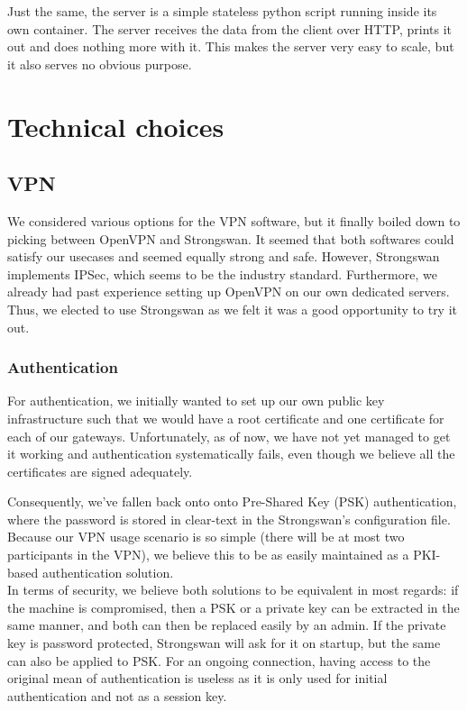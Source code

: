\documentclass[paper=a4, fontsize=11pt]{scrartcl}
\begin{document}
Just the same, the server is a simple stateless python script running inside its
own container.
The server receives the data from the client over HTTP, prints it out and does
nothing more with it.
This makes the server very easy to scale, but it also serves no obvious
purpose.

\section{Technical choices}

\subsection{VPN}

We considered various options for the VPN software, but it finally boiled down
to picking between OpenVPN and Strongswan.
It seemed that both softwares could satisfy our usecases and seemed equally
strong and safe.
However, Strongswan implements IPSec, which seems to be the industry standard.
Furthermore, we already had past experience setting up OpenVPN on our own
dedicated servers.
Thus, we elected to use Strongswan as we felt it was a good opportunity to try
it out.

\subsubsection{Authentication}

For authentication, we initially wanted to set up our own public key
infrastructure such that we would have a root certificate and one certificate
for each of our gateways.
Unfortunately, as of now, we have not yet managed to get it working and
authentication systematically fails, even though we believe all the certificates
are signed adequately.

Consequently, we've fallen back onto onto Pre-Shared Key (PSK) authentication,
where the password is stored in clear-text in the Strongswan's configuration
file.
Because our VPN usage scenario is so simple (there will be at most two
participants in the VPN), we believe this to be as easily maintained as a
PKI-based authentication solution.\\

In terms of security, we believe both solutions to be equivalent in most
regards: if the machine is compromised, then a PSK or a private key can be
extracted in the same manner, and both can then be replaced easily by an admin. 
If the private key is password protected, Strongswan will ask for it on startup,
but the same can also be applied to PSK\@.
For an ongoing connection, having access to the original mean of authentication
is useless as it is only used for initial authentication and not as a session
key.\\
\end{document}
